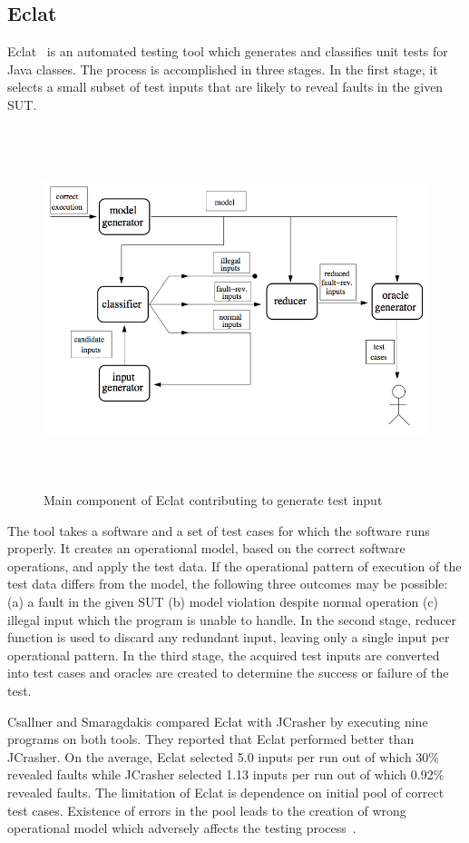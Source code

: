 \subsection{Eclat}
Eclat~\cite{pacheco2005eclat} is an automated testing tool which generates and classifies unit tests for Java classes. The process is accomplished in three stages. In the first stage, it selects a small subset of test inputs that are likely to reveal faults in the given SUT.

\begin{figure}[h]
	\centering
	\includegraphics[width=15cm, height=10.5cm]{chapter2/eclat_working.png}
	\caption{Main component of Eclat contributing to generate test input~\cite{pacheco2005eclat}}
	\label{fig:eclat}
\end{figure}


The tool takes a software and a set of test cases for which the software runs properly. It creates an operational model, based on the correct software operations, and apply the test data. If the operational pattern of execution of the test data differs from the model, the following three outcomes may be possible: (a) a fault in the given SUT (b) model violation despite normal operation (c) illegal input which the program is unable to handle. In the second stage, reducer function is used to discard any redundant input, leaving only a single input per operational pattern. In the third stage, the acquired test inputs are converted into test cases and oracles are created to determine the success or failure of the test.

Csallner and Smaragdakis compared Eclat with JCrasher by executing nine programs on  both tools. They reported that Eclat performed better than JCrasher. On the average, Eclat selected 5.0 inputs per run out of which 30\% revealed faults while JCrasher selected 1.13 inputs per run out of which 0.92\% revealed faults. The limitation of Eclat is dependence on initial pool of correct test cases. Existence of errors in the pool leads to the creation of wrong operational model which adversely affects the testing process~\cite{pacheco2007randoop}.   

